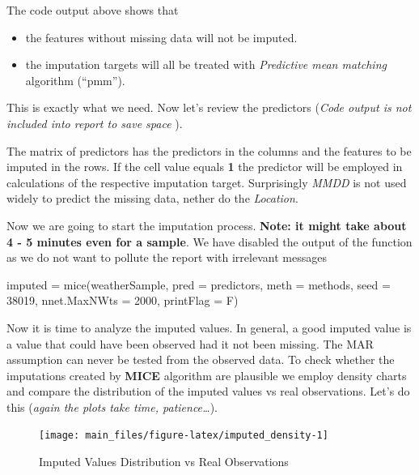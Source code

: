 The code output above shows that

\begin{itemize}
\tightlist
\item
  the features without missing data will not be imputed.
\item
  the imputation targets will all be treated with \emph{Predictive mean
  matching} algorithm (``pmm'').
\end{itemize}

This is exactly what we need. Now let's review the predictors
(\emph{Code output is not included into report to save space }).

The matrix of predictors has the predictors in the columns and the
features to be imputed in the rows. If the cell value equals \textbf{1}
the predictor will be employed in calculations of the respective
imputation target. Surprisingly \emph{MMDD} is not used widely to
predict the missing data, nether do the \emph{Location}.

Now we are going to start the imputation process. \textbf{Note: it might
take about 4 - 5 minutes even for a sample}. We have disabled the output
of the function as we do not want to pollute the report with irrelevant
messages

\begin{Schunk}
\begin{Sinput}
imputed = mice(weatherSample, pred = predictors, meth = methods, seed = 38019,
               nnet.MaxNWts = 2000, printFlag = F)
\end{Sinput}
\end{Schunk}

Now it is time to analyze the imputed values. In general, a good imputed
value is a value that could have been observed had it not been missing.
The MAR assumption can never be tested from the observed data. To check
whether the imputations created by \textbf{MICE} algorithm are plausible
we employ density charts and compare the distribution of the imputed
values vs real observations. Let's do this (\emph{again the plots take
time, patience\ldots{}}).

\begin{Schunk}
\begin{figure}[H]

{\centering \texttt{[image: main\_files/figure-latex/imputed\_density-1]} 

}

\caption[Imputed Values Distribution vs Real Observations]{Imputed Values Distribution vs Real Observations}\label{fig:imputed_density}
\end{figure}
\end{Schunk}


